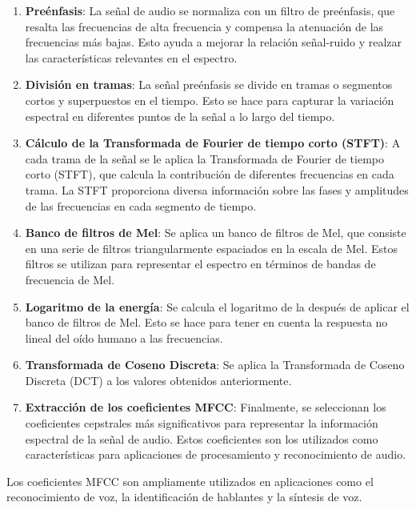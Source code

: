 \begin{enumerate}
\item \textbf{Preénfasis}: La señal de audio se normaliza con un filtro de preénfasis, que resalta las frecuencias de alta frecuencia y compensa la atenuación de las frecuencias más bajas. Esto ayuda a mejorar la relación señal-ruido y realzar las características relevantes en el espectro.

\item \textbf{División en tramas}: La señal preénfasis se divide en tramas o segmentos cortos y superpuestos en el tiempo. Esto se hace para capturar la variación espectral en diferentes puntos de la señal a lo largo del tiempo.

\item \textbf{Cálculo de la Transformada de Fourier de tiempo corto (STFT)}: A cada trama de la señal se le aplica la Transformada de Fourier de tiempo corto (STFT), que calcula la contribución de diferentes frecuencias en cada trama. La STFT proporciona diversa información sobre las fases y amplitudes de las frecuencias en cada segmento de tiempo.

\item \textbf{Banco de filtros de Mel}: Se aplica un banco de filtros de Mel, que consiste en una serie de filtros triangularmente espaciados en la escala de Mel. Estos filtros se utilizan para representar el espectro en términos de bandas de frecuencia de Mel.

\item \textbf{Logaritmo de la energía}: Se calcula el logaritmo de la después de aplicar el banco de filtros de Mel. Esto se hace para tener en cuenta la respuesta no lineal del oído humano a las frecuencias.

\item \textbf{Transformada de Coseno Discreta}: Se aplica la Transformada de Coseno Discreta (DCT) a los valores obtenidos anteriormente.

\item \textbf{Extracción de los coeficientes MFCC}: Finalmente, se seleccionan los coeficientes cepstrales más significativos para representar la información espectral de la señal de audio. Estos coeficientes son los utilizados como características para aplicaciones de procesamiento y reconocimiento de audio.
\end{enumerate}

Los coeficientes MFCC son ampliamente utilizados en aplicaciones como el reconocimiento de voz, la identificación de hablantes y la síntesis de voz.

